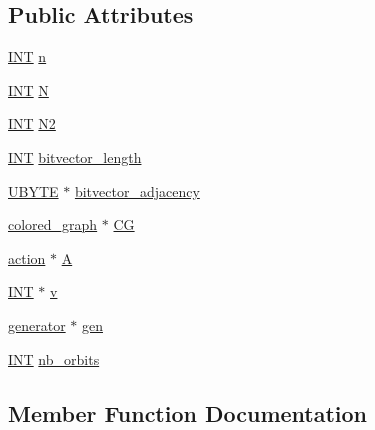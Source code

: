 \subsection*{Public Attributes}
\begin{DoxyCompactItemize}
\item 
\mbox{\hyperlink{galois_8h_a09fddde158a3a20bd2dcadb609de11dc}{I\+NT}} \mbox{\hyperlink{classhadamard_aaa7087a44d86f99804f4a42581f2a842}{n}}
\item 
\mbox{\hyperlink{galois_8h_a09fddde158a3a20bd2dcadb609de11dc}{I\+NT}} \mbox{\hyperlink{classhadamard_ae5ee601c2dbe8b01970b84422ad3a7ee}{N}}
\item 
\mbox{\hyperlink{galois_8h_a09fddde158a3a20bd2dcadb609de11dc}{I\+NT}} \mbox{\hyperlink{classhadamard_aac7ff83b713dacd1dbbb69a59ed99454}{N2}}
\item 
\mbox{\hyperlink{galois_8h_a09fddde158a3a20bd2dcadb609de11dc}{I\+NT}} \mbox{\hyperlink{classhadamard_a41b951979c27c0c4855d6203899c94bb}{bitvector\+\_\+length}}
\item 
\mbox{\hyperlink{galois_8h_a122c4acf389c050379f00341fdcd5812}{U\+B\+Y\+TE}} $\ast$ \mbox{\hyperlink{classhadamard_af616eb4ee1edff0fc597962d98fb6239}{bitvector\+\_\+adjacency}}
\item 
\mbox{\hyperlink{classcolored__graph}{colored\+\_\+graph}} $\ast$ \mbox{\hyperlink{classhadamard_ae6ebddfda23ce9e874ab97480844aff1}{CG}}
\item 
\mbox{\hyperlink{classaction}{action}} $\ast$ \mbox{\hyperlink{classhadamard_a5739909fa42b08637718cd2bf5bce169}{A}}
\item 
\mbox{\hyperlink{galois_8h_a09fddde158a3a20bd2dcadb609de11dc}{I\+NT}} $\ast$ \mbox{\hyperlink{classhadamard_a057eb008b50219f72710c974a53d08c3}{v}}
\item 
\mbox{\hyperlink{classgenerator}{generator}} $\ast$ \mbox{\hyperlink{classhadamard_aec73f1c3f54480fbeb3392a034584046}{gen}}
\item 
\mbox{\hyperlink{galois_8h_a09fddde158a3a20bd2dcadb609de11dc}{I\+NT}} \mbox{\hyperlink{classhadamard_aed9bff4bb7390e22d6f3c0001773fa55}{nb\+\_\+orbits}}
\end{DoxyCompactItemize}


\subsection{Member Function Documentation}
\mbox{\label{classhadamard_a2f9f095c9f78d125e764354279820fd5}} 
